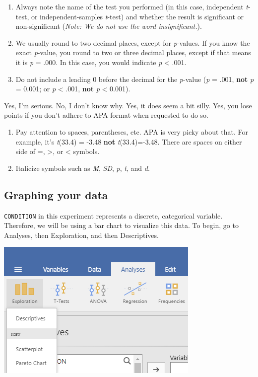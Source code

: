 \documentclass[
]{book}
\begin{document}
\begin{enumerate}
\def\labelenumi{\arabic{enumi}.}
\item
  Always note the name of the test you performed (in this case, independent \emph{t}-test, or independent-samples \emph{t}-test) and whether the result is significant or non-significant (\emph{Note: We do not use the word insignificant.}).
\item
  We usually round to two decimal places, except for \emph{p}-values. If you know the exact \emph{p}-value, you round to two or three decimal places, except if that means it is \emph{p} = .000. In this case, you would indicate \emph{p} \textless{} .001.
\item
  Do not include a leading 0 before the decimal for the \emph{p}-value (\emph{p} = .001, \textbf{not} \emph{p} = 0.001; or \emph{p} \textless{} .001, \textbf{not} \emph{p} \textless{} 0.001).
\end{enumerate}

Yes, I'm serious. No, I don't know why. Yes, it does seem a bit silly. Yes, you lose points if you don't adhere to APA format when requested to do so.

\begin{enumerate}
\def\labelenumi{\arabic{enumi}.}
\setcounter{enumi}{3}
\item
  Pay attention to spaces, parentheses, etc. APA is very picky about that. For example, it's \emph{t}(33.4) = -3.48 \textbf{not} \emph{t}(33.4)=-3.48. There are spaces on either side of =, \textgreater, or \textless{} symbols.
\item
  Italicize symbols such as \emph{M}, \emph{SD}, \emph{p}, \emph{t}, and \emph{d}.
\end{enumerate}

\hypertarget{graphing-your-data-1}{%
\subsection{Graphing your data}\label{graphing-your-data-1}}

\texttt{CONDITION} in this experiment represents a discrete, categorical variable. Therefore, we will be using a bar chart to visualize this data. To begin, go to {Analyses}, then {Exploration}, and then {Descriptives}.

\includegraphics{img/GraphingCommands.png}
\end{document}
